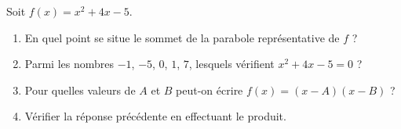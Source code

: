 
\begin{exercice}\label{exoPremiere-0095}

    Soit \( f(x)=x^2+4x-5\).
    \begin{multicols}{2}
        \begin{enumerate}
            \item
                En quel point se situe le sommet de la parabole représentative de $f$ ?
            \item
                Parmi les nombres \( -1\), \( -5\), \( 0\), \( 1\), \( 7\), lesquels vérifient \( x^2+4x-5=0\) ?
            \item
                Pour quelles valeurs de \( A\) et \( B\) peut-on écrire \( f(x)=(x-A)(x-B)\) ?
            \item
                Vérifier la réponse précédente en effectuant le produit.
        \end{enumerate}
    \end{multicols}

\end{exercice}
